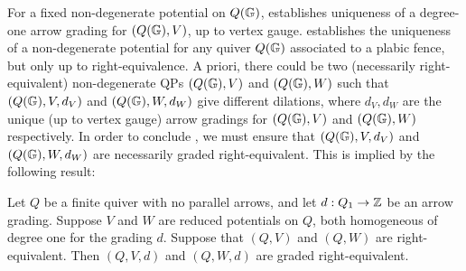 For a fixed non-degenerate potential on $Q(\mathbb G)$,  establishes uniqueness of a degree-one arrow grading for $(Q(\mathbb G),V)$, up to vertex gauge.  establishes the uniqueness of a non-degenerate potential for any quiver $Q(\mathbb G)$ associated to a plabic fence, but only up to right-equivalence. A priori, there could be two (necessarily right-equivalent) non-degenerate QPs $(Q(\mathbb G),V)$ and $(Q(\mathbb G),W)$ such that $(Q(\mathbb G),V,d_V)$ and $(Q(\mathbb G),W,d_W)$ give different dilations, where $d_V,d_W$ are the unique (up to vertex gauge) arrow gradings for $(Q(\mathbb G),V)$ and $(Q(\mathbb G),W)$ respectively. In order to conclude , we must ensure that $(Q(\mathbb G),V,d_V)$ and $(Q(\mathbb G),W,d_W)$ are necessarily graded right-equivalent. This is implied by the following result:

\begin{proposition}\label{prop:straighten}
Let $Q$ be a finite quiver with no parallel arrows, and let $d:Q_1\to\mathbb Z$ be an arrow grading. Suppose $V$ and $W$ are reduced potentials on $Q$, both homogeneous of degree one for the grading $d$. Suppose that $(Q,V)$ and $(Q,W)$ are right-equivalent. Then $(Q,V,d)$ and $(Q,W,d)$ are graded right-equivalent.
\end{proposition}

